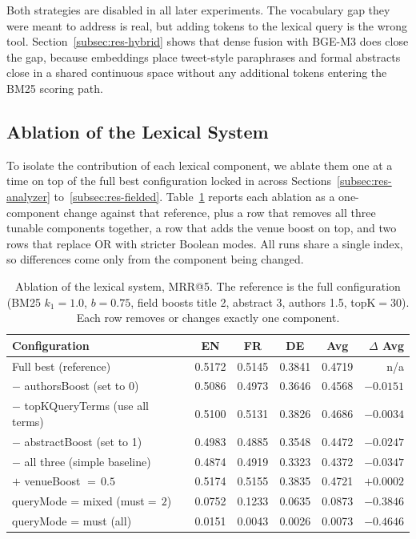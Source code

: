 Both strategies are disabled in all later experiments. The vocabulary gap they were meant to address is real, but adding tokens to the lexical query is the wrong tool. Section~\ref{subsec:res-hybrid} shows that dense fusion with BGE-M3 does close the gap, because embeddings place tweet-style paraphrases and formal abstracts close in a shared continuous space without any additional tokens entering the BM25 scoring path.

\subsection{Ablation of the Lexical System}
\label{subsec:res-ablation}

To isolate the contribution of each lexical component, we ablate them one at a time on top of the full best configuration locked in across Sections~\ref{subsec:res-analyzer} to~\ref{subsec:res-fielded}. Table~\ref{tab:ablation} reports each ablation as a one-component change against that reference, plus a row that removes all three tunable components together, a row that adds the venue boost on top, and two rows that replace OR with stricter Boolean modes. All runs share a single index, so differences come only from the component being changed.

\begin{table}[!ht]
    \caption{Ablation of the lexical system, MRR@5. The reference is the full configuration (BM25 $k_1{=}1.0$, $b{=}0.75$, field boosts title 2, abstract 3, authors 1.5, topK${=}30$). Each row removes or changes exactly one component.}
    \label{tab:ablation}
    \centering
    \begin{tabular}{lccccr}
        \toprule
        Configuration & EN & FR & DE & Avg & $\Delta$ Avg \\
        \midrule
        Full best (reference)                    & 0.5172 & 0.5145 & 0.3841 & 0.4719 & n/a \\
        \midrule
        $-$ authorsBoost (set to 0)              & 0.5086 & 0.4973 & 0.3646 & 0.4568 & $-0.0151$ \\
        $-$ topKQueryTerms (use all terms)       & 0.5100 & 0.5131 & 0.3826 & 0.4686 & $-0.0034$ \\
        $-$ abstractBoost (set to 1)             & 0.4983 & 0.4885 & 0.3548 & 0.4472 & $-0.0247$ \\
        $-$ all three (simple baseline)          & 0.4874 & 0.4919 & 0.3323 & 0.4372 & $-0.0347$ \\
        \midrule
        $+$ venueBoost ${=}\,0.5$                & 0.5174 & 0.5155 & 0.3835 & 0.4721 & $+0.0002$ \\
        queryMode = mixed (must${=}\,2$)         & 0.0752 & 0.1233 & 0.0635 & 0.0873 & $-0.3846$ \\
        queryMode = must (all)                   & 0.0151 & 0.0043 & 0.0026 & 0.0073 & $-0.4646$ \\
        \bottomrule
    \end{tabular}
\end{table}

